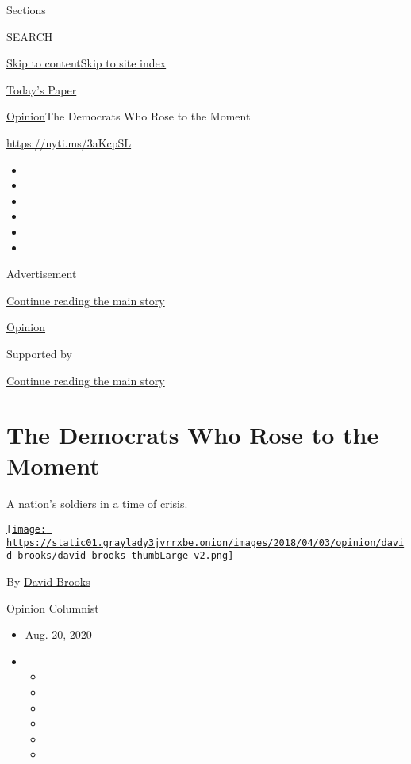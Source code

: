 Sections

SEARCH

\protect\hyperlink{site-content}{Skip to
content}\protect\hyperlink{site-index}{Skip to site index}

\href{https://myaccount.nytimes3xbfgragh.onion/auth/login?response_type=cookie\&client_id=vi}{}

\href{https://www.nytimes3xbfgragh.onion/section/todayspaper}{Today's
Paper}

\href{/section/opinion}{Opinion}\textbar{}The Democrats Who Rose to the
Moment

\url{https://nyti.ms/3aKcpSL}

\begin{itemize}
\item
\item
\item
\item
\item
\item
\end{itemize}

Advertisement

\protect\hyperlink{after-top}{Continue reading the main story}

\href{/section/opinion}{Opinion}

Supported by

\protect\hyperlink{after-sponsor}{Continue reading the main story}

\hypertarget{the-democrats-who-rose-to-the-moment}{%
\section{The Democrats Who Rose to the
Moment}\label{the-democrats-who-rose-to-the-moment}}

A nation's soldiers in a time of crisis.

\href{https://www.nytimes3xbfgragh.onion/by/david-brooks}{\texttt{[image: https://static01.graylady3jvrrxbe.onion/images/2018/04/03/opinion/david-brooks/david-brooks-thumbLarge-v2.png]}}

By \href{https://www.nytimes3xbfgragh.onion/by/david-brooks}{David
Brooks}

Opinion Columnist

\begin{itemize}
\item
  Aug. 20, 2020
\item
  \begin{itemize}
  \item
  \item
  \item
  \item
  \item
  \item
  \end{itemize}
\end{itemize}

